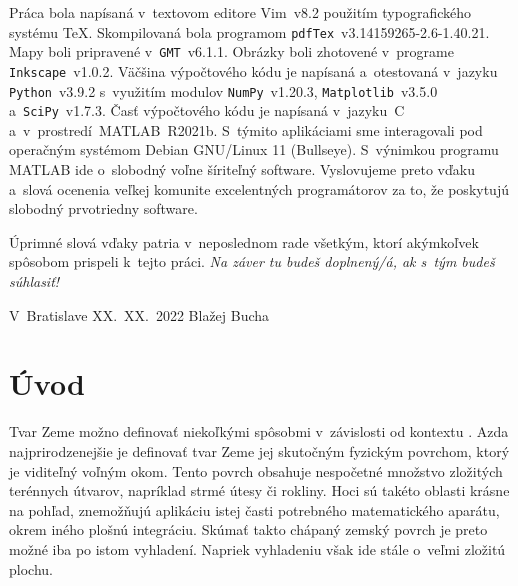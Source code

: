 \documentclass[a4paper,12pt]{book}
\begin{document}
Práca bola napísaná v~textovom editore Vim~v8.2 použitím typografického systému
\TeX.  Skompilovaná bola programom \texttt{pdfTex}~v3.14159265-2.6-1.40.21.
Mapy boli pripravené v~\texttt{GMT}~v6.1.1.  Obrázky boli zhotovené v~programe
\texttt{Inkscape}~v1.0.2.  Väčšina výpočtového kódu je napísaná
a~otestovaná v~jazyku \texttt{Python}~v3.9.2 s~využitím modulov
\texttt{NumPy}~v1.20.3, \texttt{Matplotlib}~v3.5.0 a~\texttt{SciPy}~v1.7.3.
Časť výpočtového kódu je napísaná v~jazyku~C a~v~prostredí~MATLAB~R2021b.
S~týmito aplikáciami sme interagovali pod operačným systémom Debian GNU/Linux
11 (Bullseye).  S~výnimkou programu MATLAB ide o~slobodný voľne šíriteľný
software.  Vyslovujeme preto vďaku a~slová ocenenia veľkej komunite
excelentných programátorov za to, že poskytujú slobodný prvotriedny software.

Úprimné slová vďaky patria v~neposlednom rade všetkým, ktorí akýmkoľvek
spôsobom prispeli k~tejto práci. \emph{Na záver tu budeš doplnený/á, ak s~tým
budeš súhlasiť!}


\vspace{4ex}

\noindent V~Bratislave XX.~XX.~2022 \hfill Blažej Bucha






\tableofcontents
\newpage







\chapter*{Úvod}
\label{sec:introduction}

Tvar Zeme možno definovať niekoľkými spôsobmi v~závislosti od kontextu 
\parencite{MoritzTheFigureOfTheEarth}.  Azda najprirodzenejšie je definovať 
tvar Zeme jej skutočným fyzickým povrchom, ktorý je viditeľný voľným okom.  
Tento povrch obsahuje nespočetné množstvo zložitých terénnych útvarov, 
napríklad strmé útesy či rokliny.  Hoci sú takéto oblasti krásne na pohľad, 
znemožňujú aplikáciu istej časti potrebného matematického aparátu, okrem iného 
plošnú integráciu.  Skúmať takto chápaný zemský povrch je preto možné iba po 
istom vyhladení.  Napriek vyhladeniu však ide stále o~veľmi zložitú plochu.
\end{document}
